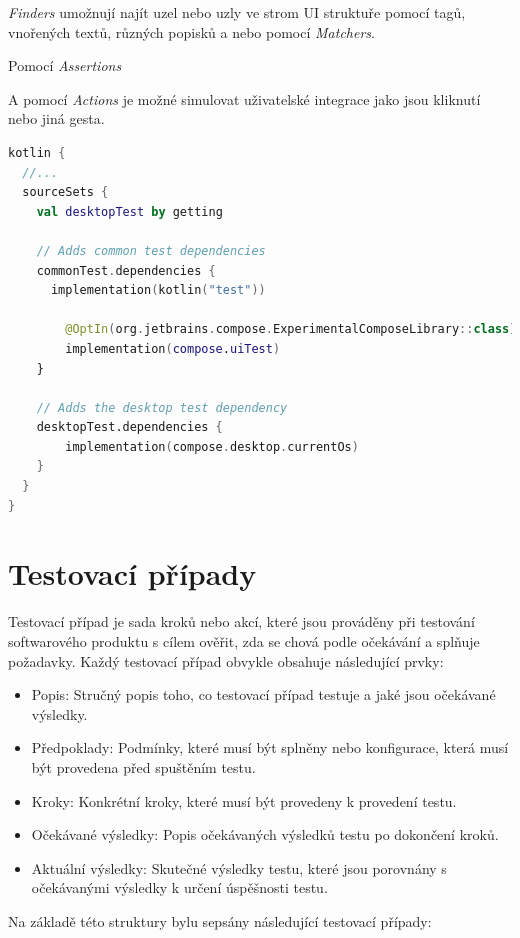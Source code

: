\textit{Finders} umožnují najít uzel nebo uzly ve strom UI struktuře pomocí tagů, vnořených textů, různých popisků a nebo pomocí \textit{Matchers}.


Pomocí \textit{Assertions}

A pomocí \textit{Actions} je možné simulovat uživatelské integrace jako jsou kliknutí nebo jiná gesta. \cite{composeTesting}


\begin{lstlisting}[caption={Integrace testů Gradle}, label={lst:testsIntegration}, language=Kotlin]
kotlin {
  //...
  sourceSets {
    val desktopTest by getting

    // Adds common test dependencies
    commonTest.dependencies {
      implementation(kotlin("test"))

        @OptIn(org.jetbrains.compose.ExperimentalComposeLibrary::class)
        implementation(compose.uiTest)
    }

    // Adds the desktop test dependency
    desktopTest.dependencies {
        implementation(compose.desktop.currentOs)
    }
  }
}
\end{lstlisting}
\section{Testovací případy}
Testovací případ je sada kroků nebo akcí, které jsou prováděny při testování softwarového produktu s cílem ověřit, zda se chová podle očekávání a splňuje 
požadavky. Každý testovací případ obvykle obsahuje následující prvky:

\begin{itemize}
  \item Popis: Stručný popis toho, co testovací případ testuje a jaké jsou očekávané výsledky.
  \item Předpoklady: Podmínky, které musí být splněny nebo konfigurace, která musí být provedena před spuštěním testu.
  \item Kroky: Konkrétní kroky, které musí být provedeny k provedení testu.
  \item Očekávané výsledky: Popis očekávaných výsledků testu po dokončení kroků.
  \item Aktuální výsledky: Skutečné výsledky testu, které jsou porovnány s očekávanými výsledky k určení úspěšnosti testu.
\end{itemize}

Na základě této struktury bylu sepsány následující testovací případy:



